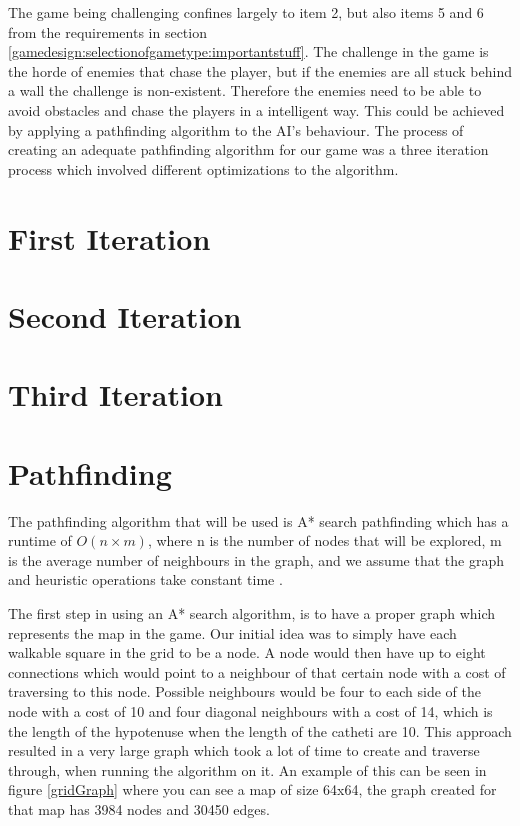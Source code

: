 The game being challenging confines largely to item 2, but also items 5 and 6 from the requirements in section \ref{gamedesign:selectionofgametype:importantstuff}.
The challenge in the game is the horde of enemies that chase the player, but if the enemies are all stuck behind a wall the challenge is non-existent.
Therefore the enemies need to be able to avoid obstacles and chase the players in a intelligent way.
This could be achieved by applying a pathfinding algorithm to the AI's behaviour.
The process of creating an adequate pathfinding algorithm for our game was a three iteration process which involved different optimizations to the algorithm.

\section{First Iteration}

\section{Second Iteration}
\section{Third Iteration}

\section{Pathfinding}

The pathfinding algorithm that will be used is A* search pathfinding which has a runtime of $O(n \times m)$, where n is the number of nodes that will be explored, m is the average number of neighbours in the graph, and we assume that the graph and heuristic operations take constant time \cite{AIG:Millington}.

The first step in using an A* search algorithm, is to have a proper graph which represents the map in the game.
Our initial idea was to simply have each walkable square in the grid to be a node.
A node would then have up to eight connections which would point to a neighbour of that certain node with a cost of traversing to this node.
Possible neighbours would be four to each side of the node with a cost of 10 and four diagonal neighbours with a cost of 14, which is the length of the hypotenuse when the length of the catheti are 10.
This approach resulted in a very large graph which took a lot of time to create and traverse through, when running the algorithm on it.
An example of this can be seen in figure \ref{gridGraph} where you can see a map of size 64x64, the graph created for that map has 3984 nodes and 30450 edges.


